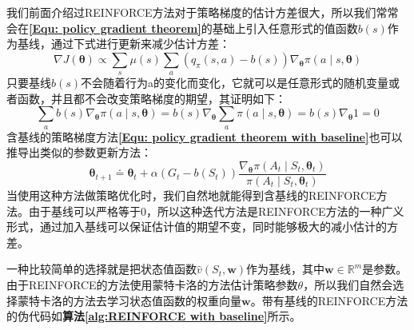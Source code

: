 我们前面介绍过REINFORCE方法对于策略梯度的估计方差很大，所以我们常常会在\textbf{\eqref{Equ: policy gradient theorem}}的基础上引入任意形式的值函数$b(s)$作为基线，通过下式进行更新来减少估计方差：
\begin{equation}
\label{Equ: policy gradient theorem with baseline}
    \nabla J(\boldsymbol{\theta}) \propto \sum_{s} \mu(s) \sum_{a}\left(q_{\pi}(s, a)-b(s)\right) \nabla_{\boldsymbol{\theta}} \pi(a \mid s, \boldsymbol{\theta})
\end{equation}
只要基线$b(s)$不会随着行为a的变化而变化，它就可以是任意形式的随机变量或者函数，并且都不会改变策略梯度的期望，其证明如下：
\begin{equation}
    \sum_{a} b(s) \nabla_{\boldsymbol{\theta}} \pi(a \mid s, \boldsymbol{\theta})=b(s) \nabla_{\boldsymbol{\theta}} \sum_{a} \pi(a \mid s, \boldsymbol{\theta})=b(s) \nabla_{\boldsymbol{\theta}} 1=0
\end{equation}
含基线的策略梯度方法\textbf{\eqref{Equ: policy gradient theorem with baseline}}也可以推导出类似的参数更新方法：
\begin{equation}
    \boldsymbol{\theta}_{t+1} \doteq \boldsymbol{\theta}_{t}+\alpha\left(G_{t}-b\left(S_{t}\right)\right) \frac{\nabla_{\boldsymbol{\theta}} \pi\left(A_{t} \mid S_{t}, \boldsymbol{\theta}_{t}\right)}{\pi\left(A_{t} \mid S_{t}, \boldsymbol{\theta}_{t}\right)}
\end{equation}
当使用这种方法做策略优化时，我们自然地就能得到含基线的REINFORCE方法。由于基线可以严格等于0，所以这种迭代方法是REINFORCE方法的一种广义形式，通过加入基线可以保证估计值的期望不变，同时能够极大的减小估计的方差。

一种比较简单的选择就是把状态值函数$\hat{v}\left(S_{t}, \mathbf{w}\right)$作为基线，其中$\mathbf{w} \in \mathbb{R}^{m}$是参数。由于REINFORCE的方法使用蒙特卡洛的方法估计策略参数$\theta$，所以我们自然会选择蒙特卡洛的方法去学习状态值函数的权重向量$\mathbf{w}$。带有基线的REINFORCE方法的伪代码如\textbf{算法\ref{alg:REINFORCE with baseline}}所示。




